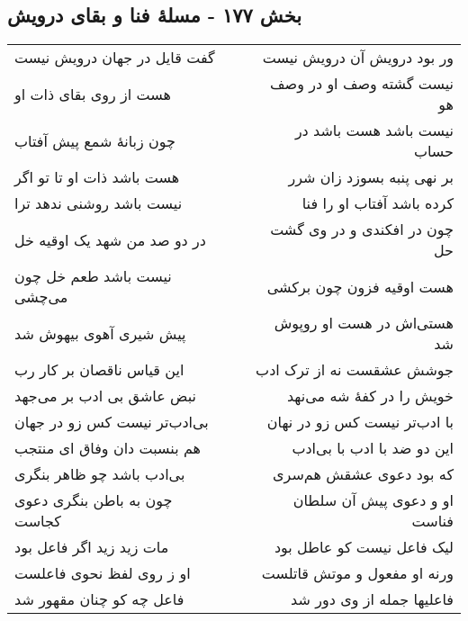 \begin{center}
\section*{بخش ۱۷۷ - مسلهٔ فنا و بقای درویش}
\label{sec:sh177}
\begin{longtable}{l p{0.5cm} r}
گفت قایل در جهان درویش نیست
&&
ور بود درویش آن درویش نیست
\\
هست از روی بقای ذات او
&&
نیست گشته وصف او در وصف هو
\\
چون زبانهٔ شمع پیش آفتاب
&&
نیست باشد هست باشد در حساب
\\
هست باشد ذات او تا تو اگر
&&
بر نهی پنبه بسوزد زان شرر
\\
نیست باشد روشنی ندهد ترا
&&
کرده باشد آفتاب او را فنا
\\
در دو صد من شهد یک اوقیه خل
&&
چون در افکندی و در وی گشت حل
\\
نیست باشد طعم خل چون می‌چشی
&&
هست اوقیه فزون چون برکشی
\\
پیش شیری آهوی بیهوش شد
&&
هستی‌اش در هست او روپوش شد
\\
این قیاس ناقصان بر کار رب
&&
جوشش عشقست نه از ترک ادب
\\
نبض عاشق بی ادب بر می‌جهد
&&
خویش را در کفهٔ شه می‌نهد
\\
بی‌ادب‌تر نیست کس زو در جهان
&&
با ادب‌تر نیست کس زو در نهان
\\
هم بنسبت دان وفاق ای منتجب
&&
این دو ضد با ادب با بی‌ادب
\\
بی‌ادب باشد چو ظاهر بنگری
&&
که بود دعوی عشقش هم‌سری
\\
چون به باطن بنگری دعوی کجاست
&&
او و دعوی پیش آن سلطان فناست
\\
مات زید زید اگر فاعل بود
&&
لیک فاعل نیست کو عاطل بود
\\
او ز روی لفظ نحوی فاعلست
&&
ورنه او مفعول و موتش قاتلست
\\
فاعل چه کو چنان مقهور شد
&&
فاعلیها جمله از وی دور شد
\\
\end{longtable}
\end{center}
